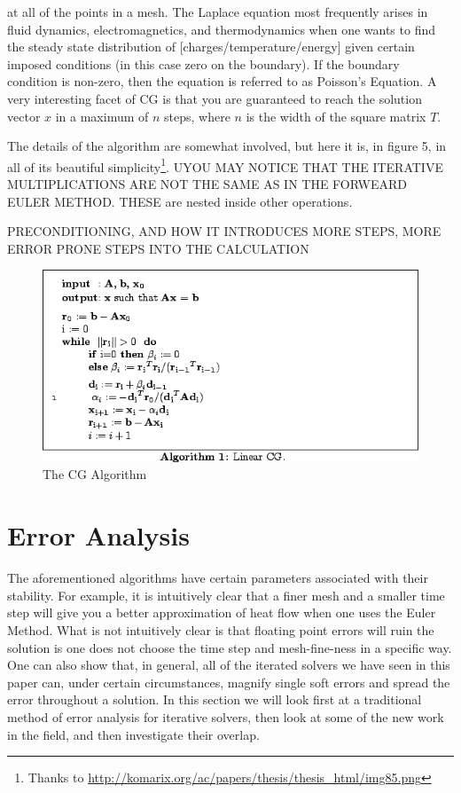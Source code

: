 \documentclass[a4paper]{article}
\begin{document}
at all of the points in a mesh. The Laplace equation most frequently arises in fluid dynamics, electromagnetics, and thermodynamics when one wants to find the steady state distribution of [charges/temperature/energy] given certain imposed conditions (in this case zero on the boundary). If the boundary condition is non-zero, then the equation is referred to as Poisson's Equation. A very interesting facet of CG is that you are guaranteed to reach the solution vector $x$ in a maximum of $n$ steps, where $n$ is the width of the square matrix $T$.

The details of the algorithm are somewhat involved, but here it is, in figure 5, in all of its beautiful simplicity\footnote{Thanks to \url{http://komarix.org/ac/papers/thesis/thesis_html/img85.png}}. UYOU MAY NOTICE THAT THE ITERATIVE MULTIPLICATIONS ARE NOT THE SAME AS IN THE FORWEARD EULER METHOD. THESE are nested inside other operations.

PRECONDITIONING, AND HOW IT INTRODUCES MORE STEPS, MORE ERROR PRONE STEPS INTO THE CALCULATION

\begin{figure}
\centering
\includegraphics[scale=0.5]{cg.png}
\caption{The CG Algorithm}
\end{figure}

\section{Error Analysis}
The aforementioned algorithms have certain parameters associated with their stability. For example, it is intuitively clear that a finer mesh and a smaller time step will give you a better approximation of heat flow when one uses the Euler Method. What is not intuitively clear is that floating point errors will ruin the solution is one  does not choose the time step and mesh-fine-ness in a specific way. One can also show that, in general, all of the iterated solvers we have seen in this paper can, under certain circumstances, magnify single soft errors and spread the error throughout a solution. In this section we will look first at a traditional method of error analysis for iterative solvers, then look at some of the new work in the field, and then investigate their overlap.
\end{document}
